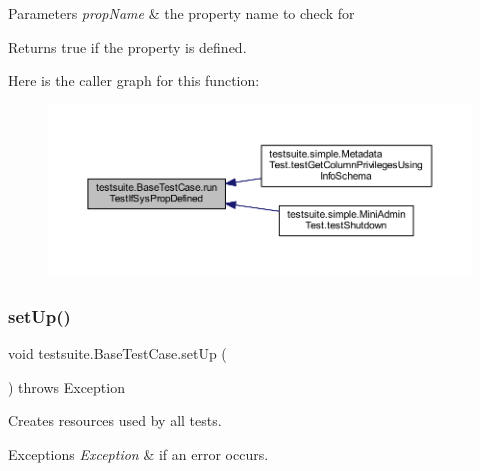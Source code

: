 \begin{DoxyParams}{Parameters}
{\em prop\+Name} & the property name to check for\\
\hline
\end{DoxyParams}
\begin{DoxyReturn}{Returns}
true if the property is defined. 
\end{DoxyReturn}
Here is the caller graph for this function\+:
\nopagebreak
\begin{figure}[H]
\begin{center}
\leavevmode
\includegraphics[width=350pt]{classtestsuite_1_1_base_test_case_a3578b222700fc502212ce9834194ebaa_icgraph}
\end{center}
\end{figure}
\mbox{\label{classtestsuite_1_1_base_test_case_a195f5d285c7979328734606d08ad15b1}} 
\subsubsection{\texorpdfstring{set\+Up()}{setUp()}}
{\footnotesize\ttfamily void testsuite.\+Base\+Test\+Case.\+set\+Up (\begin{DoxyParamCaption}{ }\end{DoxyParamCaption}) throws Exception}

Creates resources used by all tests.


\begin{DoxyExceptions}{Exceptions}
{\em Exception} & if an error occurs. \\
\hline
\end{DoxyExceptions}
\mbox{\label{classtestsuite_1_1_base_test_case_a51c7d76ab24b0c966f956250fd7a4f52}} 
